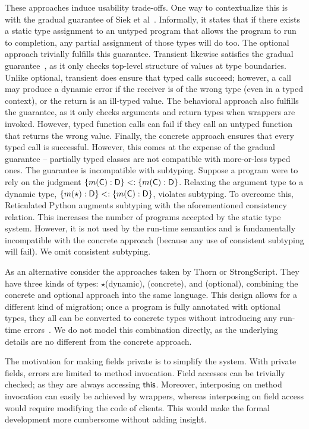 \documentclass[a4paper,UKenglish]{lipics-v2018}
\newcommand{\EM}[1]{\ensuremath{#1}\xspace}
\newcommand{\xt}[1]{{\sf{#1}}}
\newcommand{\EMxt}[1]{\EM{\xt{#1}}}
\newcommand{\any}{\EM{\star}}
\newcommand{\this}{\EMxt{this}}
\begin{document}
These approaches induce usability trade-offs. One way to contextualize this
is with the gradual guarantee of Siek et
al~\cite{GradualGuarantee}. Informally, it states that if there exists a
static type assignment to an untyped program that allows the program to run
to completion, any partial assignment of those types will do too. The
optional approach trivially fulfills this guarantee. Transient likewise
satisfies the gradual guarantee~\cite{Vitousek2017}, as it only checks
top-level structure of values at type boundaries. Unlike optional, transient
does ensure that typed calls succeed; however, a call may produce a dynamic
error if the receiver is of the wrong type (even in a typed context), or the
return is an ill-typed value. The behavioral approach also fulfills the
guarantee, as it only checks arguments and return types when wrappers are
invoked. However, typed function calls can fail if they call an untyped
function that returns the wrong value. Finally, the concrete approach
ensures that every typed call is successful. However, this comes at the
expense of the gradual guarantee -- partially typed classes are not
compatible with more-or-less typed ones. The guarantee
is incompatible with subtyping. Suppose a program were to rely on the
judgment $\{m(\C):\D\} <: \{m(\C):\D\}$. Relaxing the argument type to a
dynamic type, $\{m(\any):\D\} <: \{m(\C):\D\}$, violates subtyping. To
overcome this, Reticulated Python augments subtyping with the aforementioned
consistency relation. This increases the number of programs accepted by the
static type system. However, it is not used by the run-time semantics and
is fundamentally incompatible with the concrete approach (because any use of
consistent subtyping will fail). We omit consistent subtyping.

As an alternative consider the approaches taken by Thorn or
StrongScript. They have three kinds of types: \any (dynamic), \C (concrete),
and \xt{like} \C (optional), combining the concrete and optional approach
into the same language. This design allows for a different kind of
migration; once a program is fully annotated with optional types, they all
can be converted to concrete types without introducing any run-time
errors~\cite{ecoop15}. We do not model this combination directly, as the
underlying details are no different from the concrete approach.

The motivation for making fields private is to simplify the system. With
private fields, errors are limited to method invocation. Field accesses can
be trivially checked; as they are always accessing \this. Moreover, interposing on
method invocation can easily be achieved by wrappers, whereas interposing
on field access would require modifying the code of clients. This would make
the formal development more cumbersome without adding insight.
\end{document}
